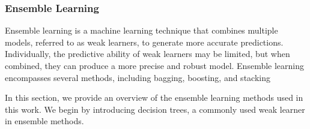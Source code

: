 \subsubsection{Ensemble Learning}
Ensemble learning is a machine learning technique that combines multiple models, referred to as weak learners, to generate more accurate predictions.
Individually, the predictive ability of weak learners may be limited, but when combined, they can produce a more precise and robust model.
Ensemble learning encompasses several methods, including bagging, boosting, and stacking\cite{James2023AnIS, pavlyshenko2018stacking}

In this section, we provide an overview of the ensemble learning methods used in this work.
We begin by introducing decision trees, a commonly used weak learner in ensemble methods.
